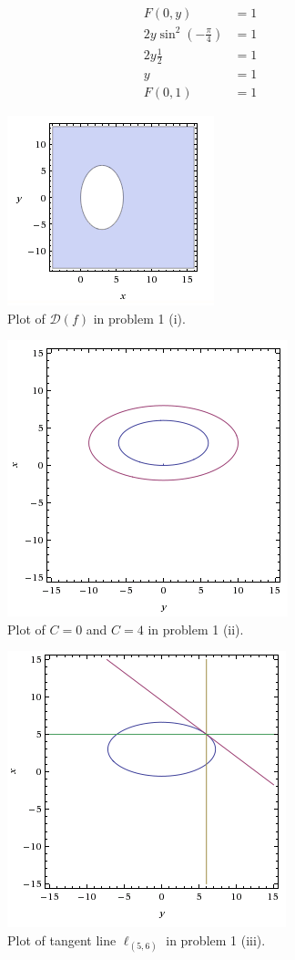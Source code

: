 \documentclass[a4paper,norsk,12pt]{article}
\begin{document}


\begin{align*}
  F(0,y) &= 1 \\
  2y \sin^2(-\frac{\pi}{4}) &= 1 \\
  2y\frac{1}{2} &= 1 \\
  y &= 1 \\
  F(0,1) &= 1
\end{align*}

\begin{figure}[h]
  \centering
  \includegraphics{ob1plot.png}
  \caption{Plot of $\mathcal{D}(f)$ in problem 1 (i).}
  \label{plot.p1}
\end{figure}

\begin{figure}[h]
  \centering
  \includegraphics{ob1plot2.png}
  \caption{Plot of $C=0$ and $C=4$ in problem 1 (ii).}
  \label{plot.p2}
\end{figure}

\begin{figure}[h]
  \centering
  \includegraphics{ob1plot3.png}
  \caption{Plot of tangent line $\ell_{(5,6)}$ in problem 1 (iii).}
  \label{plot.p3}
\end{figure}
\end{document}
